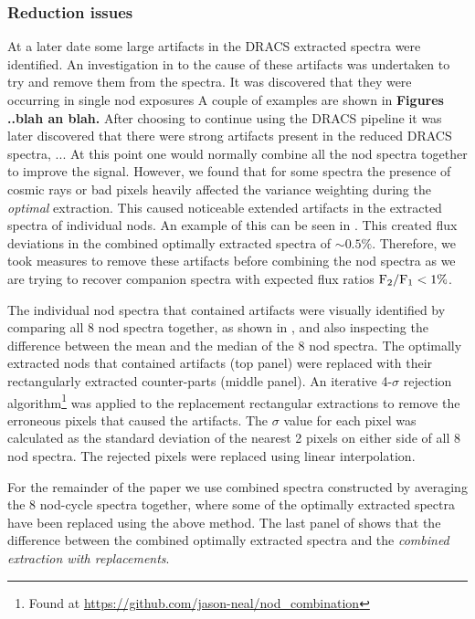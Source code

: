 \subsubsection{Reduction issues}
\label{subsubsec:reductionartifacts}
At a later date some large artifacts in the DRACS extracted spectra were identified. An investigation in to the cause of these artifacts was undertaken to try and remove them from the spectra. It was discovered that they were occurring in single nod exposures A couple of examples are shown in  \textbf{Figures ..blah an blah.} 
After choosing to continue using the DRACS pipeline it was later discovered that there were strong artifacts present in the reduced DRACS spectra, ...\unfinished{}{}
At this point one would normally combine all the nod spectra together to improve the signal. However, we found that for some spectra the presence of cosmic rays or bad pixels heavily affected the variance weighting during the \emph{optimal} extraction. This caused noticeable extended artifacts in the extracted spectra of individual nods. An example of this can be seen in . This created flux deviations in the combined optimally extracted spectra of \(\sim 0.5\% \). Therefore, we took measures to remove these artifacts before combining the nod spectra as we are trying to recover companion spectra with expected flux ratios \(\rm {F_2}/{F_1} < 1\% \). 

The individual nod spectra that contained artifacts were visually identified by comparing all 8 nod spectra together, as shown in , and also inspecting the difference between the mean and the median of the 8 nod spectra. The optimally extracted nods that contained artifacts (top panel) were replaced with their rectangularly extracted counter-parts (middle panel). An iterative 4-\(\sigma \) rejection algorithm\footnote{Found at \url{https://github.com/jason-neal/nod_combination}} was applied to the replacement rectangular extractions to remove the erroneous pixels that caused the artifacts. The \(\sigma\) value for each pixel was calculated as the standard deviation of the nearest 2 pixels on either side of all 8 nod spectra. The rejected pixels were replaced using linear interpolation.

For the remainder of the paper we use combined spectra constructed by averaging the 8 nod-cycle spectra together, where some of the optimally extracted spectra have been replaced using the above method. The last panel of  shows that the difference between the combined optimally extracted spectra and the \emph{combined extraction with replacements}.

